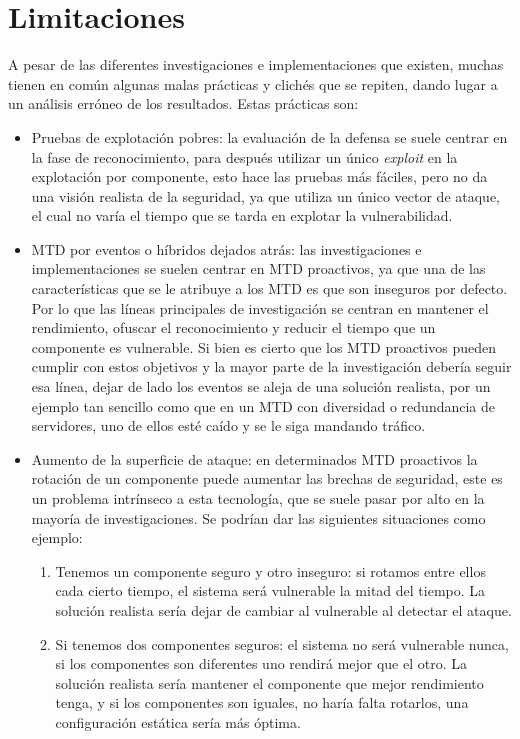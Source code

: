 \section{Limitaciones}
A pesar de las diferentes investigaciones e implementaciones que existen, muchas tienen en común algunas malas prácticas y clichés que se repiten, dando lugar a un análisis erróneo de los resultados. Estas prácticas son:
\begin{itemize}
    \item Pruebas de explotación pobres: la evaluación de la defensa se suele centrar en la fase de reconocimiento, para después utilizar un único \textit{exploit} en la explotación por componente, esto hace las pruebas más fáciles, pero no da una visión realista de la seguridad, ya que utiliza un único vector de ataque, el cual no varía el tiempo que se tarda en explotar la vulnerabilidad.
    \item MTD por eventos o híbridos dejados atrás: las investigaciones e implementaciones se suelen centrar en MTD proactivos, ya que una de las características que se le atribuye a los MTD es que son inseguros por defecto. Por lo que las líneas principales de investigación se centran en mantener el rendimiento, ofuscar el reconocimiento y reducir el tiempo que un componente es vulnerable. Si bien es cierto que los MTD proactivos pueden cumplir con estos objetivos y la mayor parte de la investigación debería seguir esa línea, dejar de lado los eventos se aleja de una solución realista, por un ejemplo tan sencillo como que en un MTD con diversidad o redundancia de servidores, uno de ellos esté caído y se le siga mandando tráfico.
    \item Aumento de la superficie de ataque: en determinados MTD proactivos la rotación de un componente puede aumentar las brechas de seguridad\cite{MTD-critica}, este es un problema intrínseco a esta tecnología, que se suele pasar por alto en la mayoría de investigaciones. Se podrían dar las siguientes situaciones como ejemplo:
    \begin{enumerate}
        \item Tenemos un componente seguro y otro inseguro: si rotamos entre ellos cada cierto tiempo, el sistema será vulnerable la mitad del tiempo. La solución realista sería dejar de cambiar al vulnerable al detectar el ataque.
        \item Si tenemos dos componentes seguros: el sistema no será vulnerable nunca, si los componentes son diferentes uno rendirá mejor que el otro. La solución realista sería mantener el componente que mejor rendimiento tenga, y si los componentes son iguales, no haría falta rotarlos, una configuración estática sería más óptima.

\end{enumerate}
\end{itemize}
